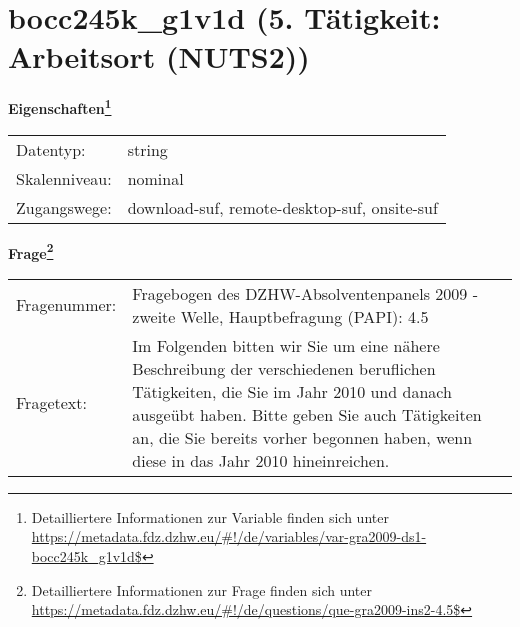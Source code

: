 
    \setcounter{footnote}{0}

    \vspace*{-1.8cm}
	\section{bocc245k\_g1v1d (5. Tätigkeit: Arbeitsort (NUTS2))}
	\label{section:bocc245k_g1v1d}



    \vspace*{0.5cm}
    \noindent\textbf{Eigenschaften\footnote{Detailliertere Informationen zur Variable finden sich unter
		\url{https://metadata.fdz.dzhw.eu/\#!/de/variables/var-gra2009-ds1-bocc245k_g1v1d$}}}\\
	\begin{tabularx}{\hsize}{@{}lX}
	Datentyp: & string \\
	Skalenniveau: & nominal \\
	Zugangswege: &
	  download-suf, 
	  remote-desktop-suf, 
	  onsite-suf
 \\
    \end{tabularx}



				\vspace*{0.5cm}
                \noindent\textbf{Frage\footnote{Detailliertere Informationen zur Frage finden sich unter
		              \url{https://metadata.fdz.dzhw.eu/\#!/de/questions/que-gra2009-ins2-4.5$}}}\\
				\begin{tabularx}{\hsize}{@{}lX}
					Fragenummer: &
					  Fragebogen des DZHW-Absolventenpanels 2009 - zweite Welle, Hauptbefragung (PAPI):
					  4.5
 \\
					Fragetext: & Im Folgenden bitten wir Sie um eine nähere Beschreibung der verschiedenen beruflichen Tätigkeiten, die Sie im Jahr 2010 und danach ausgeübt haben. Bitte geben Sie auch Tätigkeiten an, die Sie bereits vorher begonnen haben, wenn diese in das Jahr 2010 hineinreichen. \\
				\end{tabularx}





